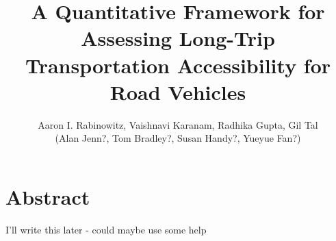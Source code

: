 \documentclass[11pt]{article}
\title{A Quantitative Framework for Assessing Long-Trip Transportation Accessibility for Road Vehicles}
\author{Aaron I. Rabinowitz, Vaishnavi Karanam, Radhika Gupta, Gil Tal\\(Alan Jenn?, Tom Bradley?, Susan Handy?, Yueyue Fan?)}
\date{}
\begin{document}
\maketitle

\section*{Abstract}

I'll write this later - could maybe use some help

\medskip
\end{document}
